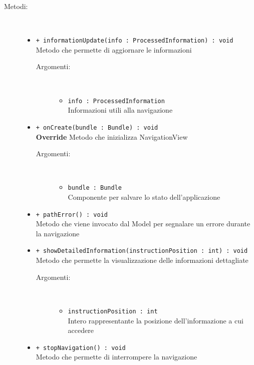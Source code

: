 \documentclass[../DefinizioneDiProdotto.tex]{subfiles}
\begin{document}
\begin{description}
\begin{itemize}
\end{itemize}
\item[Metodi:] \
\begin{itemize}
\item \texttt{+ informationUpdate(info : ProcessedInformation) : void}\\
Metodo che permette di aggiornare le informazioni
 \begin{description}
\item[Argomenti:] \
\begin{itemize}
\item \texttt{info : ProcessedInformation}\\
Informazioni utili alla navigazione\end{itemize}
\end{description}
\item \texttt{+ onCreate(bundle : Bundle) : void}\\
\textbf{Override} Metodo che inizializza NavigationView
 \begin{description}
\item[Argomenti:] \
\begin{itemize}
\item \texttt{bundle : Bundle}\\
Componente per salvare lo stato dell'applicazione\end{itemize}
\end{description}
\item \texttt{+ pathError() : void}\\
Metodo che viene invocato dal Model per segnalare un errore durante la navigazione
 \item \texttt{+ showDetailedInformation(instructionPosition : int) : void}\\
Metodo che permette la visualizzazione delle informazioni dettagliate
 \begin{description}
\item[Argomenti:] \
\begin{itemize}
\item \texttt{instructionPosition : int}\\
Intero rappresentante la posizione dell'informazione a cui accedere\end{itemize}
\end{description}
\item \texttt{+ stopNavigation() : void}\\
Metodo che permette di interrompere la navigazione
 \end{itemize}
\end{description}
\end{document}
